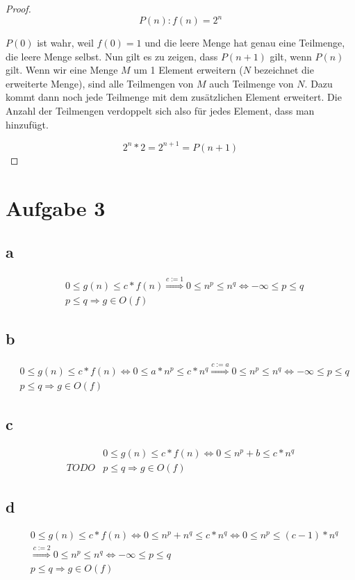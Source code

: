 \documentclass[a4paper,10pt]{article}
\begin{document}
\begin{proof}
 \begin{equation*}
  P(n): f(n) = 2^n
 \end{equation*}

 $P(0)$ ist wahr, weil $f(0) = 1$ und die leere Menge hat genau eine Teilmenge, die leere Menge selbst.
 Nun gilt es zu zeigen, dass $P(n + 1)$ gilt, wenn $P(n)$ gilt.
 Wenn wir eine Menge $M$ um 1 Element erweitern ($N$ bezeichnet die erweiterte Menge), sind alle Teilmengen von $M$ auch Teilmenge von $N$.
 Dazu kommt dann noch jede Teilmenge mit dem zusätzlichen Element erweitert.
 Die Anzahl der Teilmengen verdoppelt sich also für jedes Element, dass man hinzufügt.

 \begin{equation*}
  2^n * 2 = 2^{n + 1} = P(n + 1)
 \end{equation*}
\end{proof}

\section*{Aufgabe 3}

\subsection*{a}

\begin{align*}
 & 0 \le g(n) \le c * f(n)
 \overset{c := 1}{\Rightarrow} 0 \le n^p \le n^q
 \Leftrightarrow -\infty \le p \le q\\
 & p \le q \Rightarrow g \in O(f)
\end{align*}

\subsection*{b}

\begin{align*}
 & 0 \le g(n) \le c * f(n)
 \Leftrightarrow 0 \le a * n^p \le c * n^q
 \overset{c := a}{\Rightarrow} 0 \le n^p \le n^q
 \Leftrightarrow -\infty \le p \le q\\
 & p \le q \Rightarrow g \in O(f)
\end{align*}

\subsection*{c}

\begin{align*}
 & 0 \le g(n) \le c * f(n)
 \Leftrightarrow 0 \le n^p + b \le c * n^q\\
 TODO
 & p \le q \Rightarrow g \in O(f)
\end{align*}

\subsection*{d}

\begin{align*}
 & 0 \le g(n) \le c * f(n)
 \Leftrightarrow 0 \le n^p + n^q \le c * n^q
 \Leftrightarrow 0 \le n^p \le (c - 1) * n^q\\
 & \overset{c := 2}{\Rightarrow} 0 \le n^p \le n^q
 \Leftrightarrow -\infty \le p \le q\\
 & p \le q \Rightarrow g \in O(f)
\end{align*}
\end{document}
